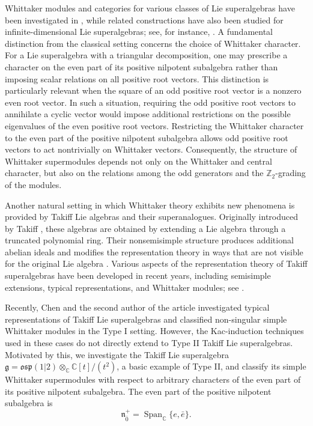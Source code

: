 \documentclass[a4paper,10pt]{article}
\theoremstyle{definition}
\theoremstyle{plain}
\theoremstyle{remark}
\theoremstyle{mystyle}
\numberwithin{equation}{section}
\begin{document}
Whittaker modules and categories for various classes of Lie superalgebras have been investigated in \cite{BCW2014,C2021,CCh24b,CCh24a}, while related constructions have also been studied for infinite-dimensional Lie superalgebras; see, for instance, \cite{MGL2024,JXZh2024,LPX2019,WCM2026}. A fundamental distinction from the classical setting concerns the choice of Whittaker character. For a Lie superalgebra with a triangular decomposition, one may prescribe a character on the even part of its positive nilpotent subalgebra rather than imposing scalar relations on all positive root vectors. This distinction is particularly relevant when the square of an odd positive root vector is a nonzero even root vector. In such a situation, requiring the odd positive root vectors to annihilate a cyclic vector would impose additional restrictions on the possible eigenvalues of the even positive root vectors. Restricting the Whittaker character to the even part of the positive nilpotent subalgebra allows odd positive root vectors to act nontrivially on Whittaker vectors. Consequently, the structure of Whittaker supermodules depends not only on the Whittaker and central character, but also on the relations among the odd generators and the $\mathbb Z_2$-grading of the modules.

Another natural setting in which Whittaker theory exhibits new phenomena is provided by Takiff Lie algebras and their superanalogues. Originally introduced by Takiff \cite{T1971}, these algebras are obtained by extending a Lie algebra through a truncated polynomial ring. Their nonsemisimple structure produces additional abelian ideals and modifies the representation theory in ways that are not visible for the original Lie algebra \cite{CSZ2016, GM17, MS19}. Various aspects of the representation theory of Takiff superalgebras have been developed in recent years, including semisimple extensions, typical representations, and Whittaker modules; see \cite{CCS2026,CC2022}.

Recently, Chen and the second author of the article \cite{CW2025} investigated typical representations of Takiff Lie superalgebras and classified non-singular simple Whittaker modules in the Type I setting. However, the Kac-induction techniques used in these cases do not directly extend to Type II Takiff Lie superalgebras. Motivated by this, we investigate the Takiff Lie superalgebra \(\mathfrak g=\mathfrak{osp}(1|2)\otimes_{\mathbb C}\mathbb C[t]/(t^2)\), a basic example of Type II, and classify its simple Whittaker supermodules with respect to arbitrary characters of the even part of its positive nilpotent subalgebra.
The even part of the positive nilpotent subalgebra is
$$
\mathfrak n^+_{\bar 0}=\operatorname{Span}_{\mathbb C}\{e,\bar e\}.
$$
\end{document}
